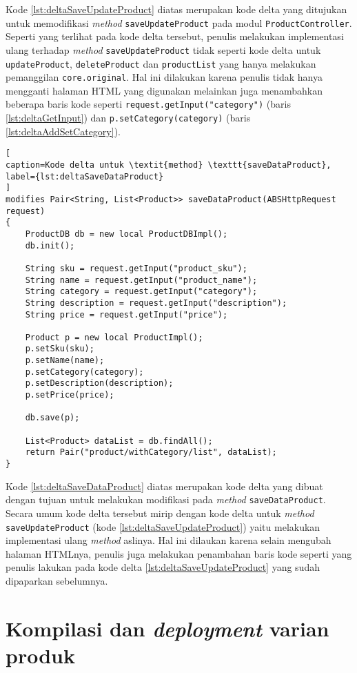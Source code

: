 Kode \ref{lst:deltaSaveUpdateProduct} diatas merupakan kode delta yang ditujukan untuk memodifikasi \textit{method} \texttt{saveUpdateProduct} pada modul \texttt{ProductController}. Seperti yang terlihat pada kode delta tersebut, penulis melakukan implementasi ulang terhadap \textit{method} \texttt{saveUpdateProduct} tidak seperti kode delta untuk \texttt{updateProduct}, \texttt{deleteProduct} dan \texttt{productList} yang hanya melakukan pemanggilan \texttt{core.original}. Hal ini dilakukan karena penulis tidak hanya mengganti halaman HTML yang digunakan melainkan juga menambahkan beberapa baris kode seperti \texttt{request.getInput("category")} (baris \ref{lst:deltaGetInput}) dan \texttt{p.setCategory(category)} (baris \ref{lst:deltaAddSetCategory}).

\begin{lstlisting}[
caption=Kode delta untuk \textit{method} \texttt{saveDataProduct},
label={lst:deltaSaveDataProduct}
]
modifies Pair<String, List<Product>> saveDataProduct(ABSHttpRequest request)
{
	ProductDB db = new local ProductDBImpl();
	db.init();
	
	String sku = request.getInput("product_sku");
	String name = request.getInput("product_name");
	String category = request.getInput("category");
	String description = request.getInput("description");
	String price = request.getInput("price");
	
	Product p = new local ProductImpl();
	p.setSku(sku);
	p.setName(name);
	p.setCategory(category);
	p.setDescription(description);
	p.setPrice(price);
	
	db.save(p);
	
	List<Product> dataList = db.findAll();
	return Pair("product/withCategory/list", dataList);
}
\end{lstlisting}

Kode \ref{lst:deltaSaveDataProduct} diatas merupakan kode delta yang dibuat dengan tujuan untuk melakukan modifikasi pada \textit{method} \texttt{saveDataProduct}. Secara umum kode delta tersebut mirip dengan kode delta untuk \textit{method} \texttt{saveUpdateProduct} (kode \ref{lst:deltaSaveUpdateProduct}) yaitu melakukan implementasi ulang \textit{method} aslinya. Hal ini dilaukan karena selain mengubah halaman HTMLnya, penulis juga melakukan penambahan baris kode seperti yang penulis lakukan pada kode delta \ref{lst:deltaSaveUpdateProduct} yang sudah dipaparkan sebelumnya.

\section{Kompilasi dan \textit{deployment} varian produk}